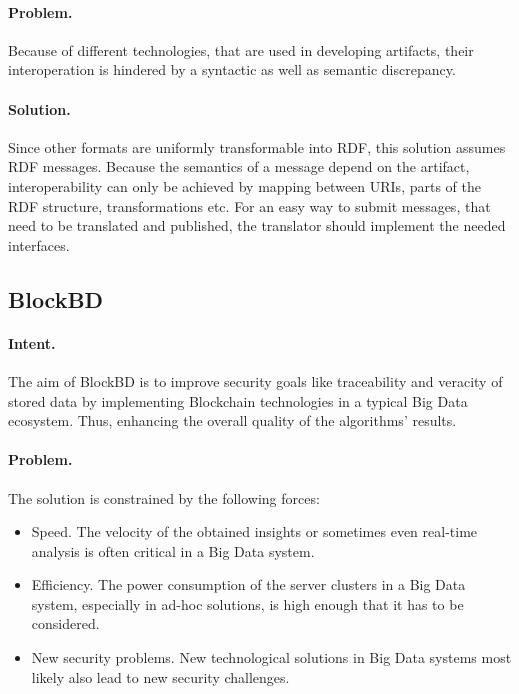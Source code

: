 \paragraph{\textbf{Problem.}} Because of different technologies, that are used in developing artifacts, their interoperation is hindered by a syntactic as well as semantic discrepancy.

\paragraph{\textbf{Solution.}} Since other formats are uniformly transformable into RDF, this solution assumes RDF messages. Because the semantics of a message depend on the artifact, interoperability can only be achieved by mapping between URIs, parts of the RDF structure, transformations etc. For an easy way to submit messages, that need to be translated and published, the translator should implement the needed interfaces.


\subsection{BlockBD~\cite{Moreno2019}} 
\label{p:block}

\paragraph{\textbf{Intent.}} The aim of BlockBD is to improve security goals like traceability and veracity of stored data by implementing Blockchain technologies in a typical Big Data ecosystem. Thus, enhancing the overall quality of the algorithms' results.

\paragraph{\textbf{Problem.}} The solution is constrained by the following forces:
\begin{itemize}
	\item Speed. The velocity of the obtained insights or sometimes even real-time analysis is often critical in a Big Data system.
	\item Efficiency. The power consumption of the server clusters in a Big Data system, especially in ad-hoc solutions, is high enough that it has to be considered.
	\item New security problems. New technological solutions in Big Data systems most likely also lead to new security challenges.
\end{itemize}

